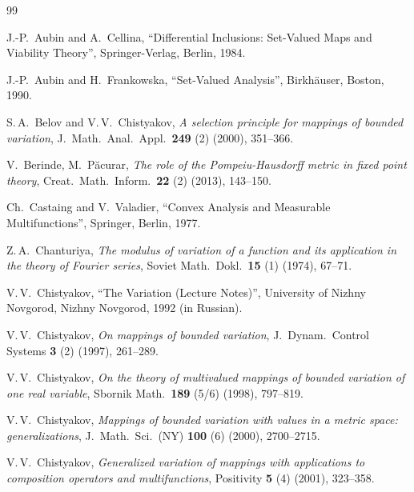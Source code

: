 \documentclass[preprint,12pt]{elsarticle}
\begin{document}
\begin{thebibliography}{99}
\renewcommand{\itemsep}{1.0pt plus 0.5pt minus 0.25pt}

J.-P.~Aubin and A.~Cellina,
``Differential Inclusions: Set-Valued Maps and Viability Theory'',
Springer-Verlag, Berlin, 1984.

J.-P.~Aubin and H.~Frankowska,
``Set-Valued Analysis'',
Birkh{\"a}user, Boston, 1990.

S.\,A.~Belov and V.\,V.~Chistyakov,
{\it A selection principle for mappings of bounded variation},
J.\ Math.\ Anal.\ Appl.\ {\bf 249} (2) (2000), 351--366.


V.~Berinde, M.~P{\u a}curar,
{\it The role of the Pompeiu-Hausdorff metric in fixed point theory},
Creat.\ Math.\ Inform.\ {\bf 22} (2) (2013), 143--150.

Ch.~Castaing and V.~Valadier,
``Convex Analysis and Measurable Multifunctions'', Springer, Berlin, 1977.

Z.\,A.~Chanturiya,
{\it The modulus of variation of a function and its application in the theory
  of Fourier series},
Soviet Math.\ Dokl.\ {\bf 15} (1) (1974), 67--71.

V.\,V.~Chistyakov, ``The Variation (Lecture Notes)'',
University of Nizhny Novgorod, Nizh\-ny Novgorod, 1992 (in Russian).

V.\,V.~Chistyakov,
{\it On mappings of bounded variation},
J.\ Dynam.\ Control Systems {\bf 3} (2) (1997), 261--289.

V.\,V.~Chistyakov,
{\it On the theory of multivalued mappings of bounded var\-i\-a\-tion of one real variable},
Sbornik Math.\ {\bf 189} (5/6) (1998), 797--819.


V.\,V.~Chistyakov,
{\it Mappings of bounded variation with values in a metric space: generalizations},
J.\ Math.\ Sci.\ (NY) {\bf 100} (6) (2000), 2700--2715.

V.\,V.~Chistyakov,
{\it Generalized variation of mappings with applications to composition operators
  and multifunctions},
Positivity {\bf 5} (4) (2001), 323--358.


\end{thebibliography}
\end{document}
